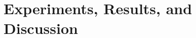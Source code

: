 \documentclass[10pt,twocolumn,letterpaper]{article}
\begin{document}


\section{Experiments, Results, and Discussion}
\end{document}
